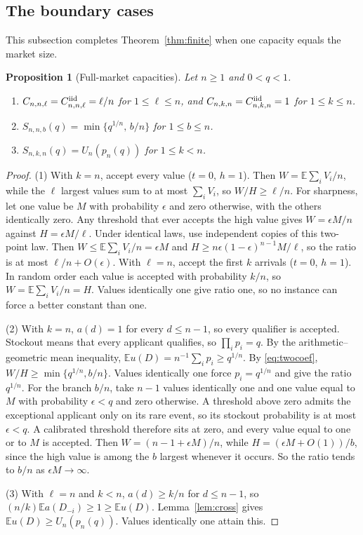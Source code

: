 \documentclass[11pt,a4paper]{article}
\newtheorem{prop}[thm]{Proposition}
\theoremstyle{remark}
\newcommand{\E}{\mathbb E}
\begin{document}
\subsection{The boundary cases}
This subsection completes Theorem~\ref{thm:finite} when one capacity equals the market size.

\begin{prop}[Full-market capacities]\label{prop:boundary}
Let $n\ge1$ and $0<q<1$.
\begin{enumerate}
\item $C_{n,n,\ell}=C^{\rm iid}_{n,n,\ell}=\ell/n$ for $1\le\ell\le n$, and $C_{n,k,n}=C^{\rm iid}_{n,k,n}=1$ for $1\le k\le n$.
\item $S_{n,n,b}(q)=\min\{q^{1/n},\,b/n\}$ for $1\le b\le n$.
\item $S_{n,k,n}(q)=U_n(p_n(q))$ for $1\le k<n$.
\end{enumerate}
\end{prop}
\begin{proof}
(1) With $k=n$, accept every value ($t=0$, $h=1$). Then $W=\E\sum_iV_i/n$, while the $\ell$ largest values sum to at most $\sum_iV_i$, so $W/H\ge\ell/n$. For sharpness, let one value be $M$ with probability $\epsilon$ and zero otherwise, with the others identically zero. Any threshold that ever accepts the high value gives $W=\epsilon M/n$ against $H=\epsilon M/\ell$. Under identical laws, use independent copies of this two-point law. Then $W\le\E\sum_iV_i/n=\epsilon M$ and $H\ge n\epsilon(1-\epsilon)^{n-1}M/\ell$, so the ratio is at most $\ell/n+O(\epsilon)$. With $\ell=n$, accept the first $k$ arrivals ($t=0$, $h=1$). In random order each value is accepted with probability $k/n$, so $W=\E\sum_iV_i/n=H$. Values identically one give ratio one, so no instance can force a better constant than one.

(2) With $k=n$, $a(d)=1$ for every $d\le n-1$, so every qualifier is accepted. Stockout means that every applicant qualifies, so $\prod_ip_i=q$. By the arithmetic--geometric mean inequality, $\E u(D)=n^{-1}\sum_ip_i\ge q^{1/n}$. By \eqref{eq:twocoef}, $W/H\ge\min\{q^{1/n},b/n\}$. Values identically one force $p_i=q^{1/n}$ and give the ratio $q^{1/n}$. For the branch $b/n$, take $n-1$ values identically one and one value equal to $M$ with probability $\epsilon<q$ and zero otherwise. A threshold above zero admits the exceptional applicant only on its rare event, so its stockout probability is at most $\epsilon<q$. A calibrated threshold therefore sits at zero, and every value equal to one or to $M$ is accepted. Then $W=(n-1+\epsilon M)/n$, while $H=(\epsilon M+O(1))/b$, since the high value is among the $b$ largest whenever it occurs. So the ratio tends to $b/n$ as $\epsilon M\to\infty$.

(3) With $\ell=n$ and $k<n$, $a(d)\ge k/n$ for $d\le n-1$, so $(n/k)\E a(D_{-i})\ge1\ge\E u(D)$. Lemma~\ref{lem:cross} gives $\E u(D)\ge U_n(p_n(q))$. Values identically one attain this.
\end{proof}
\end{document}
